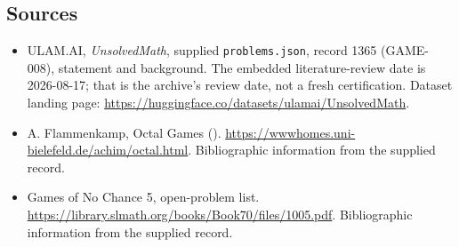 \documentclass[11pt,a4paper]{article}
\begin{document}
\subsection{Sources}

{\small

\begin{itemize}

\item[\hypertarget{source:1365:1}{S1}] ULAM.AI, \emph{UnsolvedMath}, supplied \texttt{problems.json}, record 1365 (GAME-008), statement and background. The embedded literature-review date is 2026-08-17; that is the archive’s review date, not a fresh certification. Dataset landing page: \url{https://huggingface.co/datasets/ulamai/UnsolvedMath}.

\item[\hypertarget{source:1365:2}{S2}] A. Flammenkamp, Octal Games (). \url{https://wwwhomes.uni-bielefeld.de/achim/octal.html}. Bibliographic information from the supplied record.

\item[\hypertarget{source:1365:3}{S3}] Games of No Chance 5, open-problem list. \url{https://library.slmath.org/books/Book70/files/1005.pdf}. Bibliographic information from the supplied record.

\end{itemize}

}

\label{end:1365}
\end{document}
